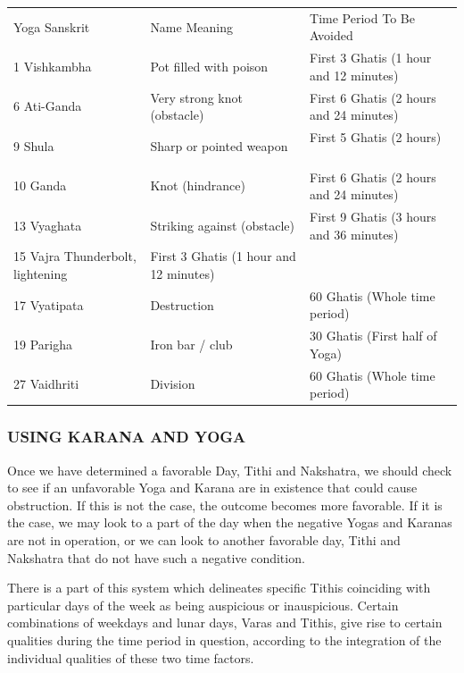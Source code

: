 \begin{enumerate}
\begin{enumerate}
 
\begin{center}
\begin{tabular}{ l l l}
Yoga	Sanskrit  &Name	Meaning	&Time  Period  To  Be  Avoided                               \\
1	Vishkambha	&Pot filled with poison	&First 3 Ghatis (1 hour  and 12 minutes)                               \\
6	Ati-Ganda	&Very strong knot (obstacle)	&First 6 Ghatis (2 hours and 24 minutes)                               \\
9	Shula	&Sharp or pointed weapon	&First 5 Ghatis (2 hours)                               \\
10	Ganda	&Knot (hindrance)	&First 6 Ghatis (2 hours and 24 minutes)                               \\
13	Vyaghata	&Striking against (obstacle)	&First 9 Ghatis (3 hours and 36 minutes)                               \\
15	Vajra	Thunderbolt, lightening	&First 3 Ghatis (1 hour  and 12 minutes)                               \\
17	Vyatipata	&Destruction	 &60 Ghatis (Whole time period)                               \\
19	Parigha	&Iron bar / club	&30 Ghatis (First half of Yoga)                               \\
27	Vaidhriti	&Division	&60 Ghatis (Whole time period)                               \\
 \end{tabular}
\end{center}

\subsubsection{USING KARANA AND YOGA}

Once we have determined a favorable Day, Tithi and Nakshatra, we should check to see if an unfavorable Yoga and Karana are in existence that could cause obstruction. If this is not the case, the outcome becomes more favorable. If it is the case, we may look to a part of the day when the negative Yogas and Karanas are not in operation, or we can look to another favorable day, Tithi and Nakshatra that do not have such a negative condition.

 

There is a part of this system which delineates specific Tithis coinciding with particular days of the week as being auspicious or inauspicious. Certain combinations of weekdays and lunar days, Varas and Tithis, give rise to certain qualities during the time period in question, according to the integration of the individual qualities of these two time factors.


\end{enumerate}
\end{enumerate}
